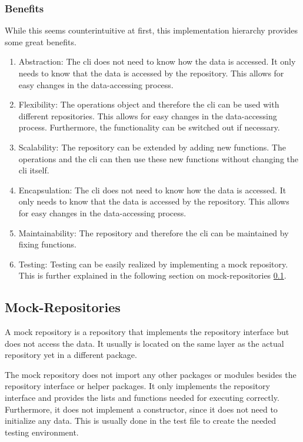 \subsubsection*{Benefits}
While this seems counterintuitive at first, this implementation hierarchy provides some great benefits.
\begin{enumerate}
    \item Abstraction: The cli does not need to know how the data is accessed.
          It only needs to know that the data is accessed by the repository.
          This allows for easy changes in the data-accessing process.
    \item Flexibility: The operations object and therefore the cli can be used with different repositories.
          This allows for easy changes in the data-accessing process.
          Furthermore, the functionality can be switched out if necessary.
    \item Scalability: The repository can be extended by adding new functions.
          The operations and the cli can then use these new functions without changing the cli itself.
    \item Encapsulation: The cli does not need to know how the data is accessed.
          It only needs to know that the data is accessed by the repository.
          This allows for easy changes in the data-accessing process.
    \item Maintainability: The repository and therefore the cli can be maintained by fixing functions.
    \item Testing: Testing can be easily realized by implementing a mock repository.
          This is further explained in the following section on mock-repositories \ref*{sec:mock_repositories}.
\end{enumerate}

\subsection{Mock-Repositories}
\label{sec:mock_repositories}
A mock repository is a repository that implements the repository interface but does not access the data.
It usually is located on the same layer as the actual repository yet in a different package.

The mock repository does not import any other packages or modules besides the repository interface or helper packages.
It only implements the repository interface and provides the lists and functions needed for executing correctly.
Furthermore, it does not implement a constructor, since it does not need to initialize any data.
This is usually done in the test file to create the needed testing environment.

